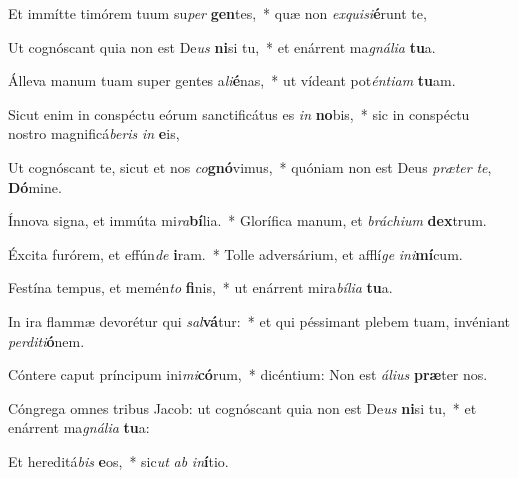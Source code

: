 \item Et immítte timórem tuum su\textit{per} \textbf{gen}tes,~* quæ non \textit{ex}\textit{qui}\textit{si}\textbf{é}runt te,
\item Ut cognóscant quia non est De\textit{us} \textbf{ni}si tu,~* et enárrent ma\textit{gná}\textit{li}\textit{a} \textbf{tu}a.
\item Álleva manum tuam super gentes a\textit{li}\textbf{é}nas,~* ut vídeant pot\textit{én}\textit{ti}\textit{am} \textbf{tu}am.
\item Sicut enim in conspéctu eórum sanctificátus es \textit{in} \textbf{no}bis,~* sic in conspéctu nostro magnificá\textit{be}\textit{ris} \textit{in} \textbf{e}is,
\item Ut cognóscant te, sicut et nos \textit{co}\textbf{gnó}vimus,~* quóniam non est Deus \textit{præ}\textit{ter} \textit{te}, \textbf{Dó}mine.
\item Ínnova signa, et immúta mi\textit{ra}\textbf{bí}lia.~* Glorífica manum, et \textit{brá}\textit{chi}\textit{um} \textbf{dex}trum.
\item Éxcita furórem, et effún\textit{de} \textbf{i}ram.~* Tolle adversárium, et afflí\textit{ge} \textit{in}\textit{i}\textbf{mí}cum.
\item Festína tempus, et memén\textit{to} \textbf{fi}nis,~* ut enárrent mira\textit{bí}\textit{li}\textit{a} \textbf{tu}a.
\item In ira flammæ devorétur qui \textit{sal}\textbf{vá}tur:~* et qui péssimant plebem tuam, invéniant \textit{per}\textit{di}\textit{ti}\textbf{ó}nem.
\item Cóntere caput príncipum ini\textit{mi}\textbf{có}rum,~* dicéntium: Non est \textit{á}\textit{li}\textit{us} \textbf{præ}ter nos.
\item Cóngrega omnes tribus Jacob: ut cognóscant quia non est De\textit{us} \textbf{ni}si tu,~* et enárrent ma\textit{gná}\textit{li}\textit{a} \textbf{tu}a:
\item Et hereditá\textit{bis} \textbf{e}os,~* sic\textit{ut} \textit{ab} \textit{in}\textbf{í}tio.
